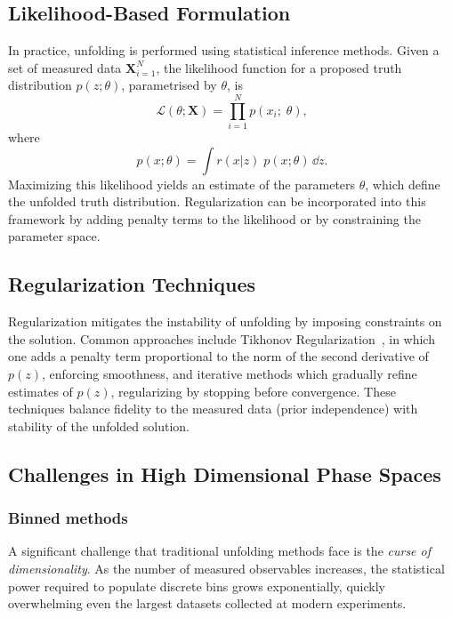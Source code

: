 \subsection{Likelihood-Based Formulation}
    In practice, unfolding is performed using statistical inference methods.
    Given a set of measured data \(\mathbf{X}_{i=1}^N\), the likelihood function for a proposed truth distribution \(p(z; \theta)\), parametrised by \(\theta\), is
    \begin{equation}
        \mathcal{L}(\theta; \mathbf{X}) = \prod_{i=1}^{N} p(x_i;\; \theta),
    \end{equation}
    where
    \begin{equation}
        p(x; \theta) = \int r(x|z) \;p(x; \theta) \, \dd z.
    \end{equation}
    Maximizing this likelihood yields an estimate of the parameters \(\theta\), which define the unfolded truth distribution.
    Regularization can be incorporated into this framework by adding penalty terms to the likelihood or by constraining the parameter space.

    \subsection{Regularization Techniques}
        Regularization mitigates the instability of unfolding by imposing constraints on the solution.
        Common approaches include Tikhonov Regularization~\cite{Karl2005RegularizationReconstruction}, in which one adds a penalty term proportional to the norm of the second derivative of \(p(z)\), enforcing smoothness, and iterative methods which gradually refine estimates of \(p(z)\), regularizing by stopping before convergence.
        These techniques balance fidelity to the measured data (prior independence) with stability of the unfolded solution.

    \subsection{Challenges in High Dimensional Phase Spaces}
    \label{subsec:challenges-in-high-dimensional-phase-spaces}
        \subsubsection{Binned methods}
        \label{subsubsec:binned-methods}
            A significant challenge that traditional unfolding methods face is the \emph{curse of dimensionality}.
            As the number of measured observables increases, the statistical power required to populate discrete bins grows exponentially, quickly overwhelming even the largest datasets collected at modern experiments.
    
